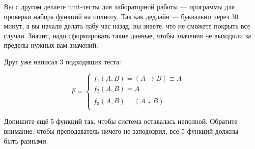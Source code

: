 \question
Вы с другом делаете unit-тесты для лабораторной работы — программы для проверки набора функций на полноту. Так как дедлайн — буквально через 30 минут, а вы начали делать лабу час назад, вы знаете, что не сможете покрыть все случаи. Значит, надо сформировать такие данные, чтобы значения не выходили за пределы нужных вам значений.

Друг уже написал 3 подходящих теста:

\begin{equation*}
    F=
    \begin{cases}
        f_1(A,B)=(A \rightarrow B) \equiv A\\
        f_2(A,B)=A\\
        f_3(A,B)=\overline{(A \downarrow B)}\\
    \end{cases}
\end{equation*}
    
Допишите ещё 5 функций так, чтобы система оставалась неполной. Обратите внимание: чтобы преподаватель ничего не заподозрил, все 5 функций должны быть разными.